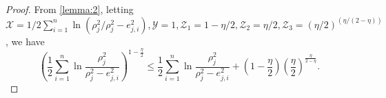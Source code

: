 \documentclass[pdflatex,sn-mathphys-num]{sn-jnl}%
\theoremstyle{thmstyleone}%
\theoremstyle{thmstyletwo}%
\theoremstyle{thmstylethree}%
\begin{document}
\begin{proof}


			
From \cref{lemma:2}, letting $\mathcal{X} =1/2\sum_{i=1}^{n} \ln({\rho_{j}^2}/{\rho_{j}^2-e_{j,i}^2}), \mathcal{Y} =1, \mathcal{Z}_{1}= {1-{\eta}/{2}}, \mathcal{Z}_{2}={\eta}/{2}, \mathcal{Z}_{3}= (\eta/2)^{(\eta/(2-\eta))}$, we have
\begin{equation}\label{eq:59}
	\left(\frac{1}{2}\sum_{i=1}^{n} \ln\frac{\rho_{j}^2}{\rho_{j}^2-e_{j,i}^2}\right)^{1-\frac{\eta}{2}} \le \frac{1}{2} \sum_{i=1}^{n} \ln\frac{\rho_{j}^2}{\rho_{j}^2-e_{j,i}^2}+\left( 1-\frac{\eta}{2}\right) \left(\frac{\eta}{2}\right)^{\frac{\eta}{2-\eta}}.
\end{equation}


\end{proof}
\end{document}

